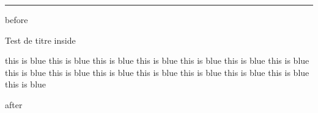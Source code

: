 \documentclass[a4paper]{article}
\begin{document}

\vspace*{18cm}

\hrule

before

\begin{titled-frame}{Test de titre}
  inside

  \color{blue}
  this is blue
  this is blue
  this is blue
  this is blue
  this is blue
  this is blue
  this is blue
  this is blue
  this is blue
  this is blue
  this is blue
  this is blue
  this is blue
  this is blue
  this is blue
\end{titled-frame}

after
\end{document}
